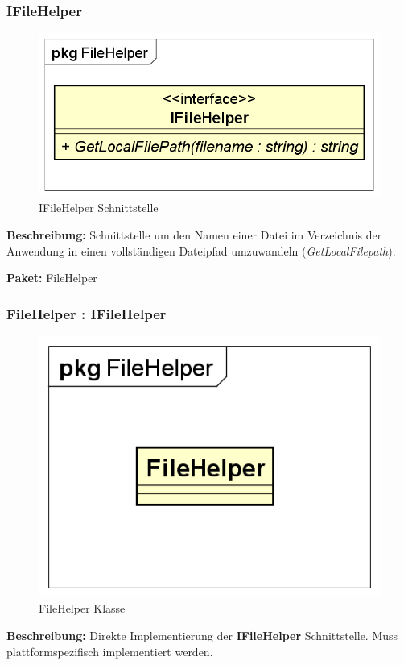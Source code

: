 \documentclass[a4paper]{scrreprt}
\begin{document}
\subsubsection{IFileHelper}
\begin{figure}[H]
\centering
\includegraphics[width=0.45\textheight]{graphics/Klassendiagramme/Model/IFileHelper.png}
\caption{IFileHelper Schnittstelle}
\end{figure}
\textbf{Beschreibung:} Schnittstelle um den Namen einer Datei im Verzeichnis der Anwendung in einen vollständigen Dateipfad umzuwandeln (\textit{GetLocalFilepath}).

\textbf{Paket:} FileHelper

\subsubsection{FileHelper : IFileHelper}
\begin{figure}[H]
\centering
\includegraphics[width=0.45\textheight]{graphics/Klassendiagramme/Model/FileHelper.png}
\caption{FileHelper Klasse}
\end{figure}
\textbf{Beschreibung:} Direkte Implementierung der \textbf{IFileHelper} Schnittstelle. Muss plattformspezifisch implementiert werden.
\end{document}

